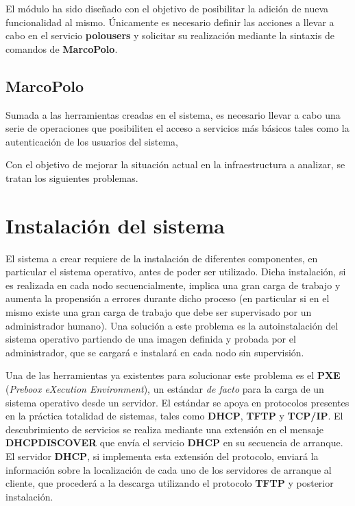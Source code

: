 El módulo ha sido diseñado con el objetivo de posibilitar la adición de nueva funcionalidad al mismo. Únicamente es necesario definir las acciones a llevar a cabo en el servicio \textbf{polousers} y solicitar su realización mediante la sintaxis de comandos de \textbf{MarcoPolo}.



\subsection{MarcoPolo}

Sumada a las herramientas creadas en el sistema, es necesario llevar a cabo una serie de operaciones que posibiliten el acceso a servicios más básicos tales como la autenticación de los usuarios del sistema, %

Con el objetivo de mejorar la situación actual en la infraestructura a analizar, se tratan los siguientes problemas.

\section{Instalación del sistema}

El sistema a crear requiere de la instalación de diferentes componentes, en particular el sistema operativo, antes de poder ser utilizado. Dicha instalación, si es realizada en cada nodo secuencialmente, implica una gran carga de trabajo y aumenta la propensión a errores durante dicho proceso (en particular si en el mismo existe una gran carga de trabajo que debe ser supervisado por un administrador humano). Una solución a este problema es la autoinstalación del sistema operativo partiendo de una imagen definida y probada por el administrador, que se cargará e instalará en cada nodo sin supervisión.

Una de las herramientas ya existentes para solucionar este problema es el \textbf{PXE} (\textit{Preboox eXecution Environment})\cite{pxeintel}, un estándar \textit{de facto}\cite{avramov:architecture} para la carga de un sistema operativo desde un servidor. El estándar se apoya en protocolos presentes en la práctica totalidad de sistemas, tales como \textbf{DHCP}, \textbf{TFTP} y \textbf{TCP/IP}. El descubrimiento de servicios se realiza mediante una extensión en el mensaje \textbf{DHCPDISCOVER} que envía el servicio \textbf{DHCP} en su secuencia de arranque\cite{rfc4578}. El servidor \textbf{DHCP}, si implementa esta extensión del protocolo, enviará la información sobre la localización de cada uno de los servidores de arranque al cliente, que procederá a la descarga utilizando el protocolo \textbf{TFTP} y posterior instalación\cite{pxeoverview}.

